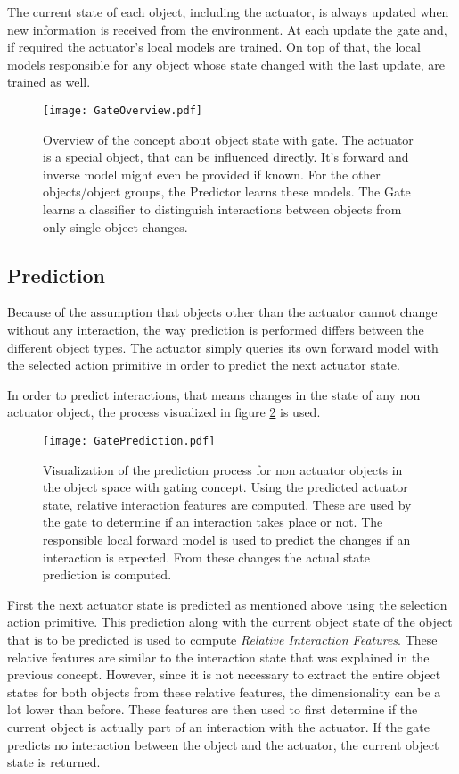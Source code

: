 The current state of each object, including the actuator, is always updated when new information is received from the environment. At each update the gate and, if required the actuator's local models are trained. On top of that, the local models responsible for any object whose state changed with the last update, are trained as well.


\begin{figure}
	\centering
	\texttt{[image: GateOverview.pdf]}
	\caption{Overview of the concept about object state with gate. The actuator is a special object, that can be influenced directly. It's forward and inverse model might even be provided if known. For the other objects/object groups, the Predictor learns these models. The Gate learns a classifier to distinguish interactions between objects from only single object changes.} 
	\label{fig:GateOverview}
\end{figure}

\subsection{Prediction}

Because of the assumption that objects other than the actuator cannot change without any interaction, the way prediction is performed differs between the different object types. The actuator simply queries its own forward model with the selected action primitive in order to predict the next actuator state. 

In order to predict interactions, that means changes in the state of any non actuator object, the process visualized in figure \ref{fig:GatePrediction} is used.

\begin{figure}
	\centering
	\texttt{[image: GatePrediction.pdf]}
	\caption{Visualization of the prediction process for non actuator objects in the object space with gating concept. Using the predicted actuator state, relative interaction features are computed. These are used by the gate to determine if an interaction takes place or not. The responsible local forward model is used to predict the changes if an interaction is expected. From these changes the actual state prediction is computed.} 
	\label{fig:GatePrediction}
\end{figure}

First the next actuator state is predicted as mentioned above using the selection action primitive.
This prediction along with the current object state of the object that is to be predicted is used to compute \textit{Relative Interaction Features}. These relative features are similar to the interaction state that was explained in the previous concept. However, since it is not necessary to extract the entire object states for both objects from these relative features, the dimensionality can be a lot lower than before. These features are then used to first determine if the current object is actually part of an interaction with the actuator. If the gate predicts no interaction between the object and the actuator, the current object state is returned. 

